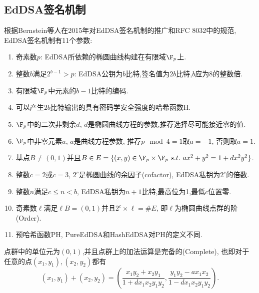\subsection{EdDSA签名机制}

根据Bernstein等人在2015年对EdDSA签名机制的推广和RFC 8032中的规范, EdDSA签名机制有11个参数:
\begin{enumerate}
\item 
奇素数$p$: EdDSA所依赖的椭圆曲线构建在有限域$\F_p$上.
\item 
整数$b$满足$2^{b-1} > p$: EdDSA公钥为$b$比特,签名值为$2b$比特,$b$应为8的整数倍.
\item
有限域$\F_p$中元素的$b-1$比特的编码.
\item
可以产生$2b$比特输出的具有密码学安全强度的哈希函数\textsf{H}.
\item
$\F_p$中的二次非剩余$d$, $d$是椭圆曲线方程的参数,推荐选择尽可能接近零的值.
\item
$\F_p$中非零元素$a$, $a$是曲线方程参数, 推荐$p \mod 4=1$取$a=-1$, 否则取$a=1$.
\item 
基点$B \neq (0, 1)$并且$B \in E = \{(x,y) \in \F_p \times \F_p\ s.t.\ ax^2 + y^2 = 1 + dx^2y^2\}$.
\item
整数$c = 2$或$c = 3$, $2^c$是椭圆曲线的余因子(cofactor), EdDSA私钥为$2^c$的倍数.
\item
整数$n$满足$c \leq n < b$, EdDSA私钥为$n+1$比特,最高位为1,最低$c$位置零.
\item
奇素数$\ell$满足$\ell B = (0,1)$并且$2^c \times \ell = \# E$, 即$\ell$为椭圆曲线点群的阶(Order).
\item
预哈希函数\textsf{PH}, PureEdDSA和HashEdDSA对\textsf{PH}的定义不同.
\end{enumerate}
点群中的单位元为$(0,1)$,并且点群上的加法运算是完备的(Complete), 
也即对于任意的点$(x_1,y_1), (x_2, y_2)$都有
$$(x_1, y_1) + (x_2, y_2) = \left( \frac{x_1y_2 + x_2y_1}{1 + dx_1x_2y_1y_2}, 
\frac{y_1y_2 - ax_1x_2}{1-dx_1x_2y_1y_2}\right).$$ 